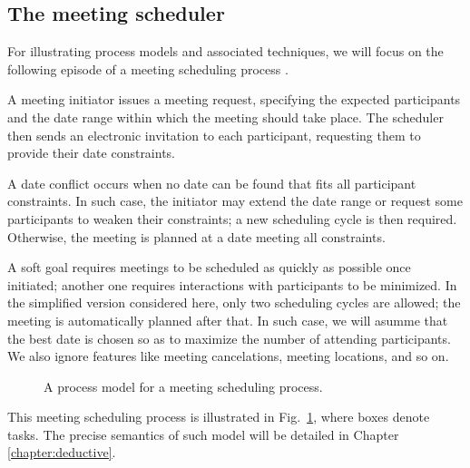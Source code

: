 \subsection{The meeting scheduler\label{subsection:background-meeting-scheduler}}

For illustrating process models and associated techniques, we will focus on the following episode of a meeting scheduling process \cite{Feather:1997}. 

A meeting initiator issues a meeting request, specifying the expected participants and the date range within which the meeting should take place. The scheduler then sends an electronic invitation to each participant, requesting them to provide their date constraints. 

A date conflict occurs when no date can be found that fits all participant constraints. In such case, the initiator may extend the date range or request some participants to weaken their constraints; a new scheduling cycle is then required. Otherwise, the meeting is planned at a date meeting all constraints.

A soft goal requires meetings to be scheduled as quickly as possible once initiated; another one requires interactions with participants to be minimized. In the simplified version considered here, only two scheduling cycles are allowed; the meeting is automatically planned after that. In such case, we will asumme that the best date is chosen so as to maximize the number of attending participants. We also ignore features like meeting cancelations, meeting locations, and so on.

\begin{figure}[H]\centering
{}
\caption{A process model for a meeting scheduling process.\label{image:scheduler-ghmsc}}
\end{figure}

This meeting scheduling process is illustrated in Fig.~\ref{image:scheduler-ghmsc}, where boxes denote tasks. The precise semantics of such model will be detailed in Chapter \ref{chapter:deductive}.

